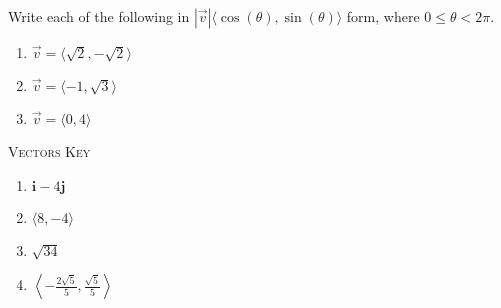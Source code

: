 Write each of the following in $|\vec{v}|\langle \cos(\theta), \sin(\theta)\rangle$ form, where $0 \leq \theta < 2\pi$.
\begin{multicols}{3}
\begin{enumerate}	\setcounter{enumi}{\value{Review}}
	\item $\vec{v} = \langle \sqrt{2}, -\sqrt{2} \rangle$
	\item $\vec{v} = \langle -1, \sqrt{3} \rangle$
	\item $\vec{v} = \langle 0, 4 \rangle$
\end{enumerate}	\setcounter{Review}{\value{enumi}}
\end{multicols}
\newpage

\textsc{Vectors Key}

\begin{enumerate}
	\item $\mathbf{i}-4\mathbf{j}$
    \item $\langle 8, -4 \rangle$
    \item $\sqrt{34}$
    \item $\left\langle -\frac{2\sqrt{5}}{5}, \frac{\sqrt{5}}{5}\right\rangle$
\end{enumerate}